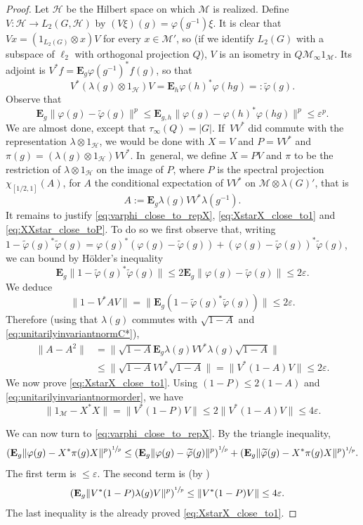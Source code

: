 \documentclass[10pt]{amsart}
\theoremstyle{plain}
\theoremstyle{definition}
\newcommand{\cM}{\mathcal{M}}
\newcommand{\E}{\mathbf{E}}
\newcommand{\cH}{\mathcal{H}}
\begin{document}
\begin{proof} Let $\cH$ be the Hilbert space on which $\cM$ is realized. Define $V \colon \cH \to L_2(G,\cH)$ by $(V\xi)(g) = \varphi(g^{-1})\xi$. It is clear that $V x= (1_{L_2(G)}\otimes x) V$ for every $x \in \cM'$, so (if we identify $L_2(G)$ with a subspace of $\ell_2$ with orthogonal projection $Q$), $V$ is an isometry in $Q \cM_\infty 1_\cM$. Its adjoint is $V^*f = \E_g \varphi(g^{-1})^* f(g)$, so that
\[
V^* (\lambda(g)\otimes 1_\cH) V = \E_h \varphi(h)^* \varphi(h g)=: \tilde \varphi(g).
\]
Observe that
\[
\E_g \|\varphi(g) - \tilde\varphi(g)\|^p \leq \E_{g,h} \|\varphi(g) - \varphi(h)^* \varphi(hg)\|^p \leq \varepsilon^p.
\]
We are almost done, except that $\tau_\infty(Q) = |G|$. If~$VV^*$ did commute with the representation $\lambda\otimes 1_\cH$, we would be done with $X=V$ and $P=VV^*$ and $\pi(g)= (\lambda(g)\otimes 1_\cH) VV^*$. In~general, we define $X=PV$ and $\pi$ to be the restriction of $\lambda \otimes 1_{\cH}$ on the image of $P$, where $P$ is the spectral projection $\chi_{[1/2,1]}(A)$, for $A$ the conditional expectation of $VV^*$ on $\cM \otimes \lambda(G)'$, that is
\[
A:= \E_g \lambda(g) VV^* \lambda(g^{-1}).
\]
It remains to justify \eqref{eq:varphi_close_to_repX}, \eqref{eq:XstarX_close_to1} and \eqref{eq:XXstar_close_toP}. To do so we first observe that, writing $1-\tilde{\varphi}(g)^* \tilde\varphi(g) = \varphi(g)^*(\varphi(g) - \tilde{\varphi}(g)) + (\varphi(g) - \tilde{\varphi}(g))^* \tilde{\varphi}(g)$, we can bound by Hölder's inequality
\begin{equation}\label{eq:tildevarphi_close_to_1} \E_g \|1-\tilde{\varphi}(g)^* \tilde\varphi(g)\| \leq 2\E_g \|\varphi(g) - \tilde{\varphi}(g)\| \leq 2{\varepsilon}.
\end{equation}
We deduce
\[
\| 1-V^*A V\| = \|\E_g (1-\tilde\varphi (g)^*\tilde\varphi(g))\| \leq 2{\varepsilon}.
\]
Therefore (using that $\lambda(g)$ commutes with $\sqrt{1-A}$ and \eqref{eq:unitarilyinvariantnormC*}),
\begin{align*} \|A - A^2\| &= \| \sqrt{1-A} \E_g \lambda(g) VV^* \lambda(g) \sqrt{1-A}\|\\
& \leq \| \sqrt{1-A} V V^* \sqrt{1-A}\| = \|V^*(1-A) V\| \leq 2{\varepsilon}.
\end{align*}
We now prove \eqref{eq:XstarX_close_to1}. Using $(1-P) \leq 2(1-A)$ and \eqref{eq:unitarilyinvariantnormorder}, we have
\[
\|1_\cM - X^*X\| = \|V^*(1-P)V\| \leq 2 \|V^* (1-A) V\| \leq 4 {\varepsilon}.
\]

We can now turn to \eqref{eq:varphi_close_to_repX}. By the triangle inequality,
\[
\left(\E_g \|\varphi(g)-X^* \pi(g) X\|^p\right)^{\sfrac 1 p}\leq \left(\E_g \|\varphi(g)-\widetilde{\varphi}(g)\|^p\right)^{\sfrac 1 p} +(\E_g \|\widetilde \varphi(g)-X^* \pi(g) X\|^p)^{\sfrac 1 p}.
\]
The first term is $\leq \varepsilon$. The second term is (by \cite[Cor.\,2.8]{MR3867328})
\begin{align*} \left(\E_g \|V^*(1-P) \lambda(g)V\|^p\right)^{\sfrac 1 p} & \leq \|V^*(1-P)V\| \leq 4\varepsilon.
\end{align*}
The last inequality is the already proved \eqref{eq:XstarX_close_to1}.


\end{proof}
\end{document}
